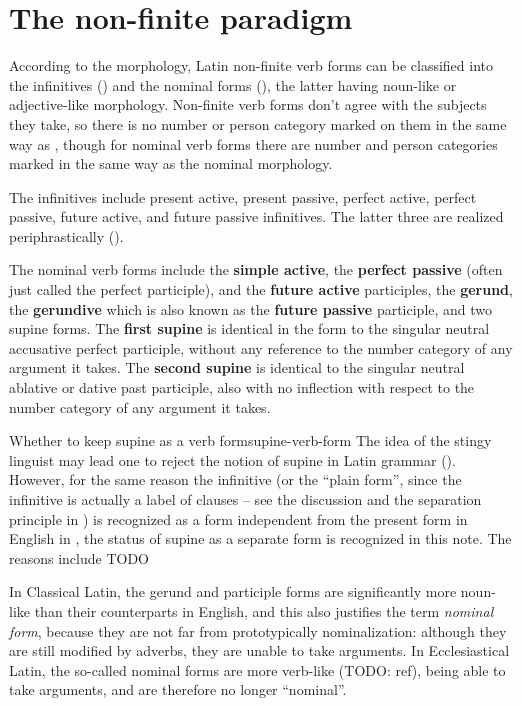 \documentclass[a4paper, oneside]{report}
\newcommand*{\citepage}[1]{p.~{#1}}
\newcommand*{\concept}[1]{\textbf{#1}}
\newcommand*{\term}[1]{\emph{#1}}
\begin{document}
\section{The non-finite paradigm}\label{sec:non-finite-abs}

According to the morphology,
Latin non-finite verb forms can be classified into the infinitives ()
and the nominal forms (),
the latter having noun-like or adjective-like morphology.
Non-finite verb forms don't agree with the subjects they take,
so there is no number or person category marked on them in the same way as ,
though for nominal verb forms there are number and person categories 
marked in the same way as the nominal morphology.

The infinitives include present active, present passive, perfect active, 
perfect passive, future active, and future passive infinitives.
The latter three are realized periphrastically ().

The nominal verb forms include 
the \concept{simple active}, 
the \concept{perfect passive} (often just called the perfect participle), 
and the \concept{future active} participles,
the \concept{gerund}, 
the \concept{gerundive} which is also known as the \concept{future passive} participle, 
and two supine forms.
The \concept{first supine} is identical in the form to the singular neutral accusative perfect participle,
without any reference to the number category of any argument it takes.
The \concept{second supine} is identical to the singular neutral ablative or dative past participle,
also with no inflection with respect to the number category of any argument it takes.

\begin{infobox}{Whether to keep supine as a verb form}{supine-verb-form}
    The idea of the stingy linguist may lead one to reject the notion of supine in Latin grammar
    ().
    However, for the same reason the infinitive 
    (or the ``plain form'', since the infinitive is actually a label of clauses 
    -- see the discussion and the separation principle in ) 
    is recognized as a form 
    independent from the present form in English in \citet[\citepage{74}]{cgel},
    the status of supine as a separate form is recognized in this note.
    The reasons include TODO
\end{infobox}

In Classical Latin, the gerund and participle forms are significantly more noun-like 
than their counterparts in English,
and this also justifies the term \term{nominal form},
because they are not far from prototypically nominalization:
although they are still modified by adverbs,
they are unable to take arguments.
In Ecclesiastical Latin, 
the so-called nominal forms are more verb-like (TODO: ref),
being able to take arguments,
and are therefore no longer ``nominal''.
\end{document}

